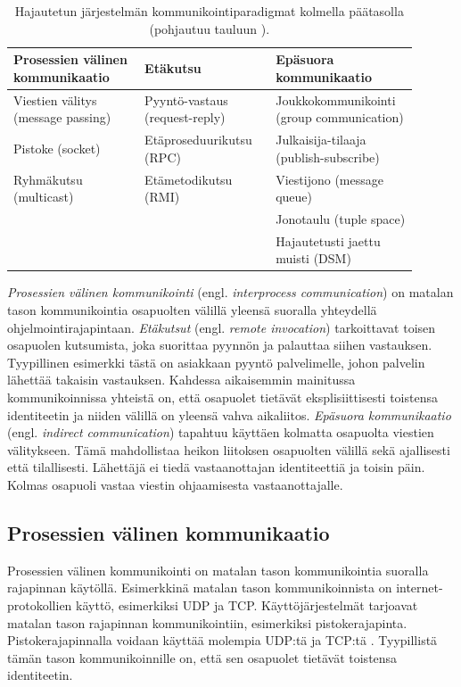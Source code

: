 \begin{table}[ht!]
	\caption{Hajautetun järjestelmän kommunikointiparadigmat kolmella päätasolla (pohjautuu tauluun \mbox{\cite[s.~46]{distributed-systems-concepts-and-design}}).}
	\label{tab:communication-paradigms}
	\begin{tabular}{p{0.3\linewidth} | p{0.3\linewidth} | p{0.3\linewidth}}
		\hline
		\textbf{Prosessien välinen kommunikaatio} & \textbf{Etäkutsu} & \textbf{Epäsuora kommunikaatio} \\
		\hline \hline
		Viestien välitys (message passing) & Pyyntö-vastaus (request-reply) & Joukkokommunikointi (group communication) \\
		\hline
		Pistoke (socket) & Etäproseduurikutsu (RPC) & Julkaisija-tilaaja (publish-subscribe) \\
		\hline
		Ryhmäkutsu (multicast) & Etämetodikutsu (RMI) & Viestijono (message queue) \\
		\hline
		& & Jonotaulu (tuple space) \\
		\hline
		& & Hajautetusti jaettu muisti (DSM) \\
		\hline
	\end{tabular}
\end{table}

\emph{Prosessien välinen kommunikointi} (engl. \emph{interprocess communication}) on matalan tason kommunikointia osapuolten välillä yleensä suoralla yhteydellä ohjelmointirajapintaan. \emph{Etäkutsut} (engl. \emph{remote invocation}) tarkoittavat toisen osapuolen kutsumista, joka suorittaa pyynnön ja palauttaa siihen vastauksen. Tyypillinen esimerkki tästä on asiakkaan pyyntö palvelimelle, johon palvelin lähettää takaisin vastauksen. Kahdessa aikaisemmin mainitussa kommunikoinnissa yhteistä on, että osapuolet tietävät eksplisiittisesti toistensa identiteetin ja niiden välillä on yleensä vahva aikaliitos. \emph{Epäsuora kommunikaatio} (engl. \emph{indirect communication}) tapahtuu käyttäen kolmatta osapuolta viestien välitykseen. Tämä mahdollistaa heikon liitoksen osapuolten välillä sekä ajallisesti että tilallisesti. Lähettäjä ei tiedä vastaanottajan identiteettiä ja toisin päin. Kolmas osapuoli vastaa viestin ohjaamisesta vastaanottajalle. \mbox{\cite[s.~43--45]{distributed-systems-concepts-and-design}}


\subsection{Prosessien välinen kommunikaatio}
\label{ch:interprocess-communication}
Prosessien välinen kommunikointi on matalan tason kommunikointia suoralla rajapinnan käytöllä. Esimerkkinä matalan tason kommunikoinnista on internet-protokollien käyttö, esimerkiksi UDP ja TCP. Käyttöjärjestelmät tarjoavat matalan tason rajapinnan kommunikointiin, esimerkiksi pistokerajapinta. Pistokerajapinnalla voidaan käyttää molempia UDP:tä ja TCP:tä \cite[s.~1152]{linux-programming-interface}. Tyypillistä tämän tason kommunikoinnille on, että sen osapuolet tietävät toistensa identiteetin.


